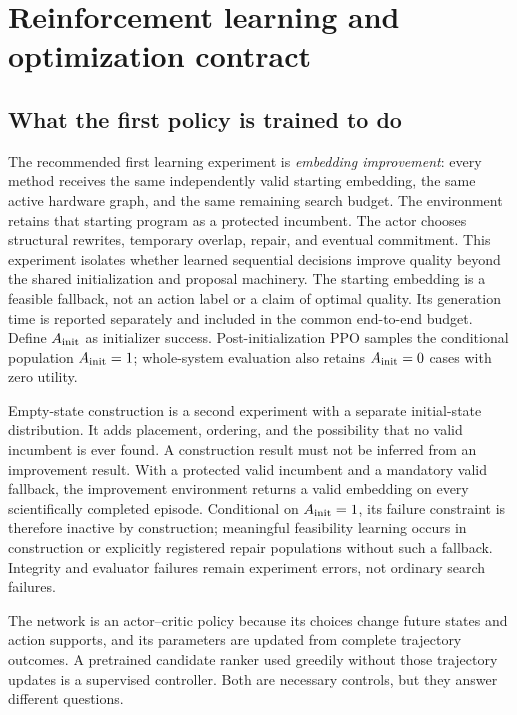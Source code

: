 \section{Reinforcement learning and optimization contract}
\label{sec:rl-training}

\subsection{What the first policy is trained to do}

The recommended first learning experiment is \emph{embedding improvement}: every method receives
the same independently valid starting embedding, the same active hardware graph, and the same
remaining search budget. The environment retains that starting program as a protected incumbent.
The actor chooses structural rewrites, temporary overlap, repair, and eventual commitment. This
experiment isolates whether learned sequential decisions improve quality beyond the shared
initialization and proposal machinery. The starting embedding is a feasible fallback, not an action
label or a claim of optimal quality. Its generation time is reported separately and included in the common end-to-end budget. Define $A_{\rm init}$ as initializer success. Post-initialization PPO samples the conditional population $A_{\rm init}=1$; whole-system evaluation also retains $A_{\rm init}=0$ cases with zero utility.

Empty-state construction is a second experiment with a separate initial-state distribution. It adds
placement, ordering, and the possibility that no valid incumbent is ever found. A construction result
must not be inferred from an improvement result. With a protected valid incumbent and a mandatory
valid fallback, the improvement environment returns a valid embedding on every scientifically
completed episode. Conditional on $A_{\rm init}=1$, its failure constraint is therefore inactive by construction; meaningful
feasibility learning occurs in construction or explicitly registered repair populations without
such a fallback. Integrity and evaluator failures remain experiment errors, not ordinary search
failures.

The network is an actor--critic policy because its choices change future states and action supports,
and its parameters are updated from complete trajectory outcomes. A pretrained candidate ranker
used greedily without those trajectory updates is a supervised controller. Both are necessary
controls, but they answer different questions.

